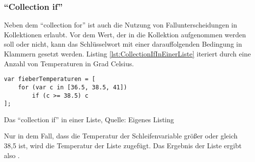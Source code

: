 \subsubsection{\enquote{Collection if}}

Neben dem \enquote{collection for} ist auch die Nutzung von Fallunterscheidungen in Kollektionen erlaubt.
Vor dem Wert, der in die Kollektion aufgenommen werden soll oder nicht,  kann  das Schlüsselwort  mit einer darauffolgenden Bedingung in Klammern gesetzt werden.
Listing \ref{lst:CollectionIfInEinerListe} iteriert durch eine Anzahl von Temperaturen in Grad Celsius.


\ifIncludeFigures
  \begin{listing}[ht]
    \begin{verbatim}
var fieberTemperaturen = [
    for (var c in [36.5, 38.5, 41])
        if (c >= 38.5) c
];
\end{verbatim}
    \caption[\enquote{Collection if} in einer Liste]{Das \enquote{collection if} in einer Liste, Quelle: Eigenes Listing}
    \label{lst:CollectionIfInEinerListe}
  \end{listing}
\fi

Nur in dem Fall, dass die Temperatur der Schleifenvariable  größer oder gleich 38,5 ist, wird die Temperatur der Liste zugefügt.
Das Ergebnis der Liste  ergibt also \IC{[38.5, 41]}.



